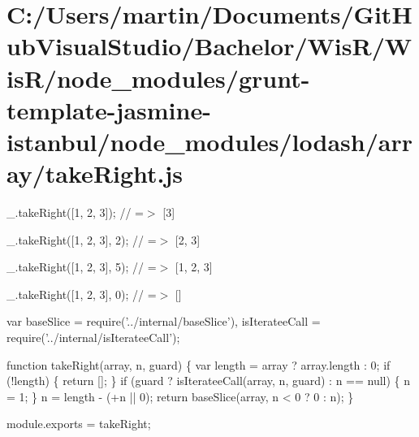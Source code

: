 \hypertarget{_c_1_2_users_2martin_2_documents_2_git_hub_visual_studio_2_bachelor_2_wis_r_2_wis_r_2node_module227f301c932f3412e1933931142dc2bf}{}\section{C\+:/\+Users/martin/\+Documents/\+Git\+Hub\+Visual\+Studio/\+Bachelor/\+Wis\+R/\+Wis\+R/node\+\_\+modules/grunt-\/template-\/jasmine-\/istanbul/node\+\_\+modules/lodash/array/take\+Right.\+js}
\+\_\+.\+take\+Right(\mbox{[}1, 2, 3\mbox{]}); // =$>$ \mbox{[}3\mbox{]}

\+\_\+.\+take\+Right(\mbox{[}1, 2, 3\mbox{]}, 2); // =$>$ \mbox{[}2, 3\mbox{]}

\+\_\+.\+take\+Right(\mbox{[}1, 2, 3\mbox{]}, 5); // =$>$ \mbox{[}1, 2, 3\mbox{]}

\+\_\+.\+take\+Right(\mbox{[}1, 2, 3\mbox{]}, 0); // =$>$ \mbox{[}\mbox{]}


\begin{DoxyCodeInclude}
var baseSlice = require(\textcolor{stringliteral}{'../internal/baseSlice'}),
    isIterateeCall = require(\textcolor{stringliteral}{'../internal/isIterateeCall'});

\textcolor{keyword}{function} takeRight(array, n, guard) \{
  var length = array ? array.length : 0;
  \textcolor{keywordflow}{if} (!length) \{
    \textcolor{keywordflow}{return} [];
  \}
  \textcolor{keywordflow}{if} (guard ? isIterateeCall(array, n, guard) : n == null) \{
    n = 1;
  \}
  n = length - (+n || 0);
  \textcolor{keywordflow}{return} baseSlice(array, n < 0 ? 0 : n);
\}

module.exports = takeRight;
\end{DoxyCodeInclude}
 